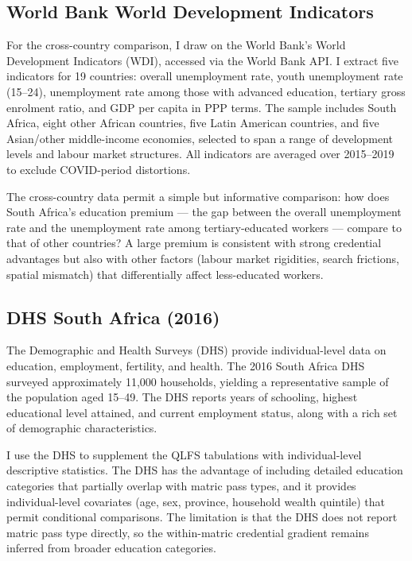 \documentclass[12pt]{article}
\begin{document}
\subsection{World Bank World Development Indicators}

For the cross-country comparison, I draw on the World Bank's World Development Indicators (WDI), accessed via the World Bank API. I extract five indicators for 19 countries: overall unemployment rate, youth unemployment rate (15--24), unemployment rate among those with advanced education, tertiary gross enrolment ratio, and GDP per capita in PPP terms. The sample includes South Africa, eight other African countries, five Latin American countries, and five Asian/other middle-income economies, selected to span a range of development levels and labour market structures. All indicators are averaged over 2015--2019 to exclude COVID-period distortions.

The cross-country data permit a simple but informative comparison: how does South Africa's education premium --- the gap between the overall unemployment rate and the unemployment rate among tertiary-educated workers --- compare to that of other countries? A large premium is consistent with strong credential advantages but also with other factors (labour market rigidities, search frictions, spatial mismatch) that differentially affect less-educated workers.

\subsection{DHS South Africa (2016)}

The Demographic and Health Surveys (DHS) provide individual-level data on education, employment, fertility, and health. The 2016 South Africa DHS surveyed approximately 11{,}000 households, yielding a representative sample of the population aged 15--49. The DHS reports years of schooling, highest educational level attained, and current employment status, along with a rich set of demographic characteristics.

I use the DHS to supplement the QLFS tabulations with individual-level descriptive statistics. The DHS has the advantage of including detailed education categories that partially overlap with matric pass types, and it provides individual-level covariates (age, sex, province, household wealth quintile) that permit conditional comparisons. The limitation is that the DHS does not report matric pass type directly, so the within-matric credential gradient remains inferred from broader education categories.
\end{document}
